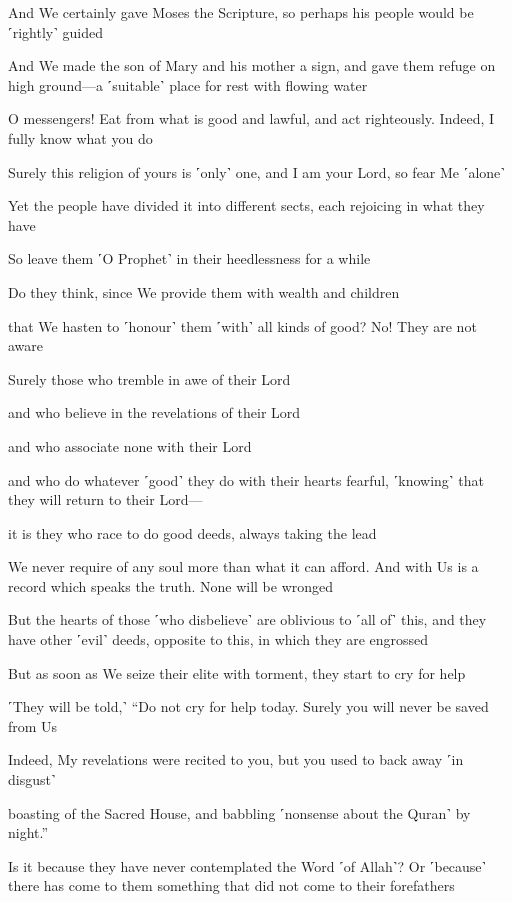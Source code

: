 And We certainly gave Moses the Scripture, so perhaps his people would be ˹rightly˺ guided

And We made the son of Mary and his mother a sign, and gave them refuge on high ground—a ˹suitable˺ place for rest with flowing water

O messengers! Eat from what is good and lawful, and act righteously. Indeed, I fully know what you do

Surely this religion of yours is ˹only˺ one, and I am your Lord, so fear Me ˹alone˺

Yet the people have divided it into different sects, each rejoicing in what they have

So leave them ˹O Prophet˺ in their heedlessness for a while

Do they think, since We provide them with wealth and children

that We hasten to ˹honour˺ them ˹with˺ all kinds of good? No! They are not aware

Surely those who tremble in awe of their Lord

and who believe in the revelations of their Lord

and who associate none with their Lord

and who do whatever ˹good˺ they do with their hearts fearful, ˹knowing˺ that they will return to their Lord—

it is they who race to do good deeds, always taking the lead

We never require of any soul more than what it can afford. And with Us is a record which speaks the truth. None will be wronged

But the hearts of those ˹who disbelieve˺ are oblivious to ˹all of˺ this, and they have other ˹evil˺ deeds, opposite to this, in which they are engrossed

But as soon as We seize their elite with torment, they start to cry for help

˹They will be told,˺ “Do not cry for help today. Surely you will never be saved from Us

Indeed, My revelations were recited to you, but you used to back away ˹in disgust˺

boasting of the Sacred House, and babbling ˹nonsense about the Quran˺ by night.”

Is it because they have never contemplated the Word ˹of Allah˺? Or ˹because˺ there has come to them something that did not come to their forefathers

